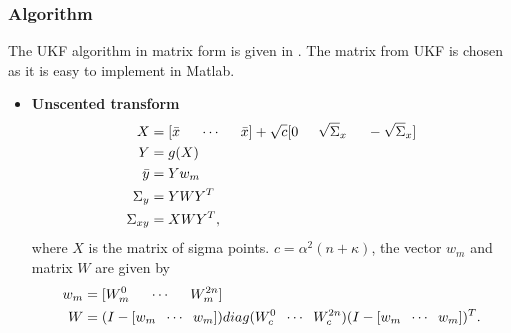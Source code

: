 \subsubsection{Algorithm}
The UKF algorithm in matrix form is given in \citep{sim07}. The matrix from UKF is chosen as it is easy to implement in Matlab.
\begin{itemize}
    \item \textbf{Unscented transform}
    \begin{equation}
        \begin{split}
            X &= [ \bar x \hspace{5mm} \cdots \hspace{5mm} \bar x ]+ \sqrt c [ 0 \hspace{5mm} \sqrt \Sigma_x \hspace{5mm} - \sqrt \Sigma_x ]\\
            Y &= g(X) \\
            \bar y &= Y w_m\\
            \Sigma_y &= Y W Y^T \\
            \Sigma_{xy} &= X W Y^T,
        \end{split}
    \end{equation}
    where $X$ is the matrix of sigma points. $c=\alpha^2(n+\kappa)$, the vector $w_m$ and matrix $W$ are given by
    \begin{equation}
        \begin{split}
        w_m &= [W_m^0 \hspace{5mm} \cdots \hspace{5mm} W_m^{2n} ]\\
        W &= (I-[w_m \hspace{2mm} \cdots \hspace{2mm} w_m])diag(W_c^0 \hspace{2mm} \cdots \hspace{2mm} W_c^{2n}) (I-[w_m \hspace{2mm} \cdots \hspace{2mm} w_m])^T.
        \end{split}
    \end{equation} 
    

\end{itemize}
